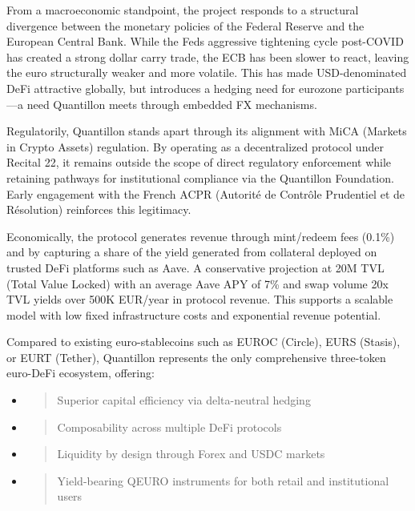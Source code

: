 From a macroeconomic standpoint, the project responds to a structural
divergence between the monetary policies of the Federal Reserve and the
European Central Bank. While the Fed\textquotesingle s aggressive
tightening cycle post-COVID has created a strong dollar carry trade, the
ECB has been slower to react, leaving the euro structurally weaker and
more volatile. This has made USD-denominated DeFi attractive globally,
but introduces a hedging need for eurozone participants---a need
Quantillon meets through embedded FX mechanisms.

Regulatorily, Quantillon stands apart through its alignment with MiCA
(Markets in Crypto Assets) regulation. By operating as a decentralized
protocol under Recital 22, it remains outside the scope of direct
regulatory enforcement while retaining pathways for institutional
compliance via the Quantillon Foundation. Early engagement with the
French ACPR (Autorité de Contrôle Prudentiel et de Résolution)
reinforces this legitimacy.

Economically, the protocol generates revenue through mint/redeem fees
(0.1\%) and by capturing a share of the yield generated from collateral
deployed on trusted DeFi platforms such as Aave. A conservative
projection at 20M TVL (Total Value Locked) with an average Aave APY of
7\% and swap volume 20x TVL yields over 500K EUR/year in protocol
revenue. This supports a scalable model with low fixed infrastructure
costs and exponential revenue potential.

Compared to existing euro-stablecoins such as EUROC (Circle), EURS
(Stasis), or EURT (Tether), Quantillon represents the only comprehensive
three-token euro-DeFi ecosystem, offering:

\begin{itemize}
\item
  \begin{quote}
  Superior capital efficiency via delta-neutral hedging
  \end{quote}
\item
  \begin{quote}
  Composability across multiple DeFi protocols
  \end{quote}
\item
  \begin{quote}
  Liquidity by design through Forex and USDC markets
  \end{quote}
\item
  \begin{quote}
  Yield-bearing QEURO instruments for both retail and institutional
  users
  \end{quote}
\end{itemize}

